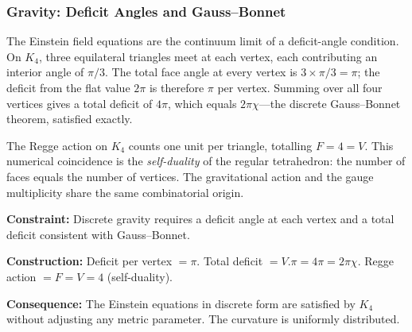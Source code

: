 \documentclass[11pt,a4paper]{book}
\def\cdot{.}%
\begin{document}
\subsubsection*{Gravity: Deficit Angles and Gauss--Bonnet}

The Einstein field equations are the continuum limit of a deficit-angle
condition.  On $K_4$, three equilateral triangles meet at each vertex,
each contributing an interior angle of $\pi/3$.  The total face angle
at every vertex is $3 \times \pi/3 = \pi$; the deficit from the flat
value $2\pi$ is therefore $\pi$ per vertex.  Summing over all four vertices
gives a total deficit of $4\pi$, which equals $2\pi\chi$---the discrete
Gauss--Bonnet theorem, satisfied exactly.

The Regge action on $K_4$ counts one unit per triangle, totalling
$F = 4 = V$.  This numerical coincidence is the \emph{self-duality}
of the regular tetrahedron: the number of faces equals the number of
vertices.  The gravitational action and the gauge multiplicity share
the same combinatorial origin.

\textbf{Constraint:}
Discrete gravity requires a deficit angle at each vertex and a total
deficit consistent with Gauss--Bonnet.

\textbf{Construction:}
Deficit per vertex $= \pi$.  Total deficit $= V \cdot \pi = 4\pi = 2\pi\chi$.
Regge action $= F = V = 4$ (self-duality).

\textbf{Consequence:}
The Einstein equations in discrete form are satisfied by $K_4$ without
adjusting any metric parameter.  The curvature is uniformly distributed.
\end{document}
